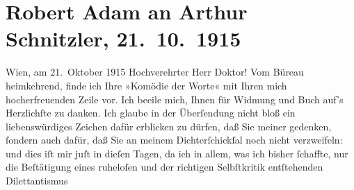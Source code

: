 

         
         \renewcommand{\erwaehntePersonen}{Personen: Robert Adam}
         \renewcommand{\erwaehnteOrte}{Orte: Wien}
         \renewcommand{\erwaehnteWerke}{Werke: Komödie der Worte. Drei Einakter}
               \section[Robert Adam an Arthur Schnitzler, 21. 10. 1915]{ Robert Adam an Arthur Schnitzler, 21. 10. 1915}\nopagebreak{}\rehead{ }\begin{ledgroupsized}[t]{13cm}\normalsize\beginnumbering{} \toendnotes[C]{\smallbreak\pagebreak[2]} 
\toendnotes[C]{\smallbreak}\pstart
           \raggedleft{}{\pb}Wien, am 21. Oktober 1915\pend
           \pstart{}Hochverehrter Herr Doktor!\pend\pstart
           Vom Büreau heimkehrend, finde ich Ihre »Komödie der
                  Worte« mit Ihren mich hocherfreuenden Zeile vor.\pend
           \pstart
           Ich beeile mich, Ihnen für Widmung und Buch auf’s Herzlichſte zu danken.\pend
           \pstart
           Ich glaube in der Überſendung nicht bloß ein liebenswürdiges Zeichen dafür erblicken
               zu dürfen, daß Sie meiner gedenken, ſondern auch dafür, daß Sie an meinem
               Dichterſchickſal noch nicht verzweifeln: und dies iſt mir juſt in dieſen Tagen, da
               ich in allem, was ich bisher ſchaffte, nur die Beſtätigung eines ruheloſen und der
               richtigen Selbſtkritik {\pb}entſtehenden Dilettantismus

\end{ledgroupsized}
